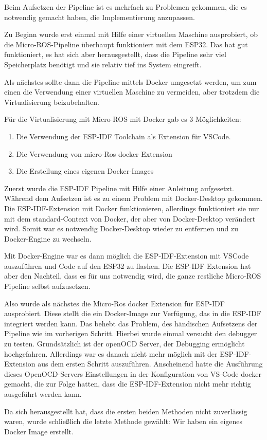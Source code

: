 \begin{flushleft}
    Beim Aufsetzen der Pipeline ist es mehrfach zu Problemen gekommen, die es notwendig gemacht haben, die Implementierung anzupassen.

    Zu Beginn wurde erst einmal mit Hilfe einer virtuellen Maschine ausprobiert, ob die Micro-ROS-Pipeline überhaupt funktioniert mit dem ESP32.
    Das hat gut funktioniert, es hat sich aber herausgestellt, dass die Pipeline sehr viel Speicherplatz benötigt und sie relativ tief ins System eingreift.
    
    Als nächstes sollte dann die Pipeline mittels Docker umgesetzt werden, um zum einen die Verwendung einer virtuellen Maschine zu vermeiden, aber trotzdem die Virtualisierung beizubehalten.

    Für die Virtualisierung mit Micro-ROS mit Docker gab es 3 Möglichkeiten:
    \begin{enumerate}
        \item Die Verwendung der ESP-IDF Toolchain als Extension für VSCode.
        \item Die Verwendung von micro-Ros docker Extension
        \item Die Erstellung eines eigenen Docker-Images
    \end{enumerate}

    Zuerst wurde die ESP-IDF Pipeline mit Hilfe einer Anleitung aufgesetzt. 
    Während dem Aufsetzen ist es zu einem Problem mit Docker-Desktop gekommen. Die ESP-IDF-Extension mit Docker funktionieren, allerdings funktioniert sie nur mit dem standard-Context von Docker, der aber von Docker-Desktop verändert wird.
    Somit war es notwendig Docker-Desktop wieder zu entfernen und zu Docker-Engine zu wechseln.

    Mit Docker-Engine war es dann möglich die ESP-IDF-Extension mit VSCode auszuführen und Code auf den ESP32 zu flashen.
    Die ESP-IDF Extension hat aber den Nachteil, dass es für uns notwendig wird, die ganze restliche Micro-ROS Pipeline selbst aufzusetzen.

    Also wurde als nächstes die Micro-Ros docker Extension für ESP-IDF ausprobiert. Diese stellt die ein Docker-Image zur Verfügung, das in die ESP-IDF integriert werden kann. Das behebt das Problem, des händischen Aufsetzens der Pipeline wie im vorherigen Schritt.
    Hierbei wurde einmal versucht den debugger zu testen. Grundsätzlich ist der openOCD Server, der Debugging ermöglicht hochgefahren. Allerdings war es danach nicht mehr möglich mit der ESP-IDF-Extension aus dem ersten Schritt auszuführen. 
    Anscheinend hatte die Ausführung dieses OpenOCD-Servers Einstellungen in der Konfiguration von VS-Code docker gemacht, die zur Folge hatten, dass die ESP-IDF-Extension nicht mehr richtig ausgeführt werden kann.

    Da sich herausgestellt hat, dass die ersten beiden Methoden nicht zuverlässig waren, wurde schließlich die letzte Methode gewählt: Wir haben ein eigenes Docker Image erstellt.
\end{flushleft}